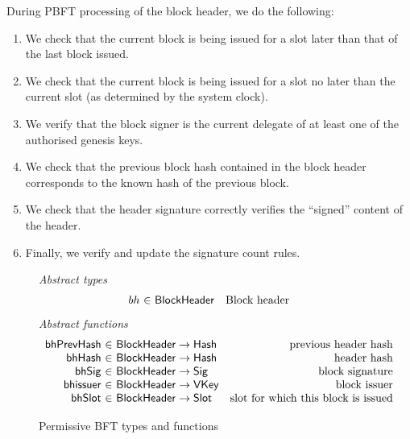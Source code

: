 \documentclass[11pt,a4paper]{article}
\newcommand{\fun}[1]{\mathsf{#1}}
\newcommand{\type}[1]{\mathsf{#1}}
\newcommand{\totalf}{\to}
\newcommand{\Hash}{\type{Hash}}  %
\newcommand{\Slot}{\type{Slot}}
\newcommand{\VKey}{\type{VKey}}
\newcommand{\Sig}{\type{Sig}}
\newcommand{\bhsigname}{bhSig}
\newcommand{\bhissuername}{bhissuer}
\begin{document}
During PBFT processing of the block header, we do the following:
\begin{enumerate}
 \item We check that the current block is being issued for a slot later than
    that of the last block issued.
  \item We check that the current block is being issued for a slot no later than
    the current slot (as determined by the system clock).
  \item We verify that the block signer is the current delegate of at least one
    of the authorised genesis keys.
  \item We check that the previous block hash contained in the block header
    corresponds to the known hash of the previous block.
  \item We check that the header signature correctly verifies the ``signed''
    content of the header.
  \item Finally, we verify and update the signature count rules.
  \end{enumerate}
  \begin{figure}[ht]
  \emph{Abstract types}
  \begin{equation*}
    \begin{array}{r@{~\in~}lr}
      bh & \Bhead & \text{Block header}
    \end{array}
  \end{equation*}
  \emph{Abstract functions}
  \begin{equation*}
    \begin{array}{r@{~\in~}lr}
      \fun{\bhprevhashname} & \Bhead \totalf \Hash & \text{previous header hash} \\
      \fun{\bhhashname} & \Bhead \totalf \Hash & \text{header hash} \\
      \fun{\bhsigname} & \Bhead \totalf \Sig & \text{block signature} \\
      \fun{\bhissuername} & \Bhead \totalf \VKey & \text{block issuer} \\
      \fun{\bhslotname} & \Bhead \totalf \Slot & \text{slot for which this block is issued}
    \end{array}
  \end{equation*}
  \caption{Permissive BFT types and functions}
  \label{fig:defs:pbft}
\end{figure}
\end{document}
